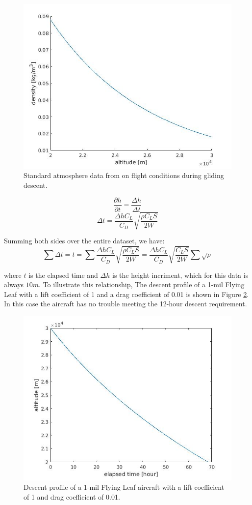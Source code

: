 \documentclass[12pt]{report} %
\begin{document}
\begin{figure}
\includegraphics[width = 0.7\linewidth]{density.jpg}
\centering
\caption{Standard atmosphere data from \cite{standardAtmosphere} on flight conditions during gliding descent.}
\label{density}
\end{figure}

\[\frac{\partial{h}}{\partial{t}} = \frac{\Delta h}{\Delta t} \]
\[\Delta t =  \frac{\Delta h C_L}{C_D}\sqrt{\frac{\rho C_L S}{2W}}\]

Summing both sides over the entire dataset, we have:
\[ \sum\Delta t = t = \sum \frac{\Delta h C_L}{C_D}\sqrt{\frac{\rho C_L S}{2W}}
= \frac{\Delta h C_L}{C_D}\sqrt{\frac{C_L S}{2W}} \sum\sqrt{\rho}\]

where $t$ is the elapsed time and $\Delta h$ is the height incriment, which for this data is always $10m$. To illustrate this relationship,
The descent profile of a 1-mil Flying Leaf with a lift coefficient of 1 and a drag coefficient of 0.01 is shown in Figure \ref{descent}.
In this case the aircraft has no trouble meeting the 12-hour descent requirement.

\begin{figure}
\includegraphics[width = 0.7\linewidth]{cl1cd01.jpg}
\centering
\caption{Descent profile of a 1-mil Flying Leaf aircraft with a lift coefficient of 1 and drag coefficient of 0.01.}
\label{descent}
\end{figure}
\end{document}
